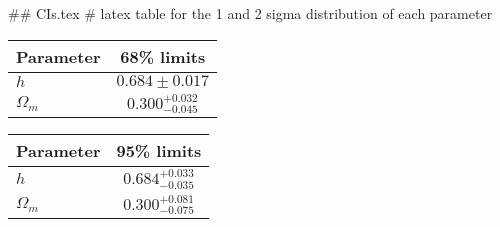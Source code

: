 ## CIs.tex
# latex table for the 1 and 2 sigma distribution of each parameter

\begin{tabular} { l  c}
 Parameter &  68\% limits\\
\hline
{\boldmath$h              $} & $0.684\pm 0.017            $\\
{\boldmath$\Omega_m       $} & $0.300^{+0.032}_{-0.045}   $\\
\hline
\end{tabular}

\begin{tabular} { l  c}
 Parameter &  95\% limits\\
\hline
{\boldmath$h              $} & $0.684^{+0.033}_{-0.035}   $\\
{\boldmath$\Omega_m       $} & $0.300^{+0.081}_{-0.075}   $\\
\hline
\end{tabular}
